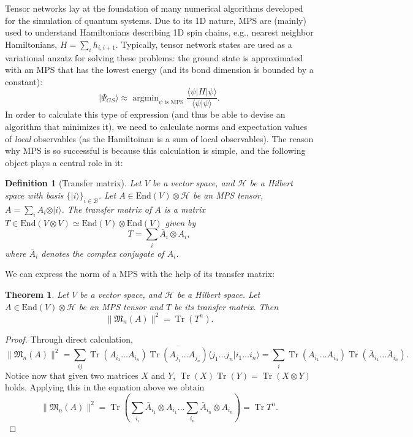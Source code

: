 \documentclass{article}
\newtheorem{theorem}{Theorem}
\newtheorem{definition}{Definition}
\newcommand{\tr}{\operatorname{Tr}}
\newcommand{\End}{\mathrm{End}}
\newcommand{\ket}[1]{\vert #1 \rangle}
\newcommand{\bra}[1]{\langle #1 \vert}
\newcommand{\scalprod}[2]{\langle #1 \vert #2 \rangle}
\begin{document}
Tensor networks lay at the foundation of many numerical algorithms developed for the simulation of quantum systems. Due to its 1D nature, MPS are (mainly) used to understand Hamiltonians describing 1D spin chains, e.g., nearest neighbor Hamiltonians, $H = \sum_{i} h_{i,i+1}$. Typically, tensor network states are used as a variational anzatz for solving these problems: the ground state is approximated with an MPS that has the lowest energy (and its bond dimension is bounded by a constant):
\begin{equation*}
  \ket{\Psi_{GS}} \approx \mathop{\mathrm{argmin}}_{\psi\text{ is MPS}} \frac{\bra{\psi}H\ket{\psi}}{\scalprod{\psi}{\psi}}. 
\end{equation*}
In order to calculate this type of expression (and thus be able to devise an algorithm that minimizes it), we need to calculate norms and expectation values of \emph{local} observables (as the Hamiltoinan is a sum of local observables). The reason why MPS is so successful is because this calculation is simple, and the following object plays a central role in it:
\begin{definition}[Transfer matrix]
  Let $V$ be a vector space, and $\mathcal{H}$ be a Hilbert space with basis $\{\ket{i}\}_{i\in \mathcal{B}}$. Let $A\in \End(V)\otimes \mathcal{H}$ be an MPS tensor, $A = \sum_i A_i \otimes \ket{i}$. The \emph{transfer matrix} of $A$ is a matrix $T\in \End(V\otimes V) \simeq \End(V)\otimes \End(V)$ given by 
  \begin{equation*}
    T = \sum_i \bar{A}_i \otimes A_i,
  \end{equation*}
  where $\bar{A}_i$ denotes the complex conjugate of $A_i$.
\end{definition}
We can express the norm of a MPS with the help of its transfer matrix:
\begin{theorem}
  Let $V$ be a vector space, and $\mathcal{H}$ be a Hilbert space. Let $A\in \End(V)\otimes \mathcal{H}$ be an MPS tensor and $T$ be its transfer matrix. Then
  \begin{equation*}
    \|\mathfrak{M}_n(A)\|^2 = \tr (T^n). 
  \end{equation*}
\end{theorem}

\begin{proof}
Through direct calculation,
\begin{equation*}
  \| \mathfrak{M}_n(A) \|^2 = \sum_{ij} \tr(A_{i_1} \dots A_{i_n}) \overline{\tr (A_{j_1} \dots A_{j_n})} \scalprod{j_1 \dots j_n}{i_1 \dots i_n} = \sum_{i} \tr(A_{i_1} \dots A_{i_n}) \tr (\bar{A}_{i_1} \dots \bar{A}_{i_n}).
\end{equation*}
Notice now that given two matrices $X$ and $Y$, $\tr(X) \tr(Y) = \tr(X\otimes Y)$ holds. Applying this in the equation above we obtain
\begin{equation*}
  \| \mathfrak{M}_n(A) \|^2 = \tr\left(\sum_{i_i} \bar{A}_{i_1} \otimes A_{i_1} \dots \sum_{i_n} \bar{A}_{i_n}\otimes A_{i_n}\right) = \tr T^n.
\end{equation*}
\end{proof}
\end{document}
